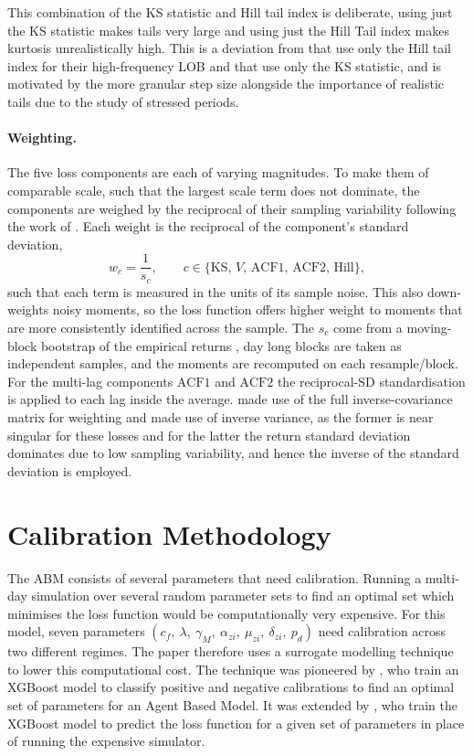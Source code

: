 This combination of the KS statistic and Hill tail index is deliberate, using just the KS statistic makes tails very large and using just the Hill Tail index makes kurtosis unrealistically high. This is a deviation from \cite{gao_2022_hfabm} that use only the Hill tail index for their high-frequency LOB and \cite{gao_2022_xgb} that use only the KS statistic, and is motivated by the more granular step size alongside the importance of realistic tails due to the study of stressed periods.

\paragraph{Weighting.} The five loss components are each of varying magnitudes. To make them of comparable scale, such that the largest scale term does not dominate, the components are weighed by the reciprocal of their sampling variability following the work of \cite{franke_westerhoff_2012}. Each weight is the reciprocal of the component's standard deviation,
\begin{equation}
\label{eq:cal-w}
w_c = \frac{1}{s_c}, \qquad c \in \{\mathrm{KS},\,V,\,\mathrm{ACF1},\,\mathrm{ACF2},\,\mathrm{Hill}\},
\end{equation}
such that each term is measured in the units of its sample noise. This also down-weights noisy moments, so the loss function offers higher weight to moments that are more consistently identified across the sample. 
The $s_c$ come from a moving-block bootstrap of the empirical returns \citep{kunsch_1989}, day long blocks are taken as independent samples, and the moments are recomputed on each resample/block. For the multi-lag components $\mathrm{ACF1}$ and $\mathrm{ACF2}$ the reciprocal-SD
standardisation is applied to each lag inside the average. \cite{franke_westerhoff_2012} made use of the full inverse-covariance matrix for weighting and \cite{gao_2022_hfabm} made use of inverse variance, as the former is near singular for these losses and for the latter the return standard deviation dominates due to low sampling variability, and hence the inverse of the standard deviation is employed. 


\section{Calibration Methodology}
\label{sec:cal-method}

The ABM consists of several parameters that need calibration. Running a multi-day simulation over several random parameter sets to find an optimal set which minimises the loss function would be computationally very expensive. For this model, seven parameters $(c_f,\ \lambda,\ \gamma_M,\ \alpha_{zi},\ \mu_{zi},\ \delta_{zi},\ p_d)$ need calibration across two different regimes. The paper therefore uses a surrogate modelling technique to lower this computational cost. The technique was  pioneered by \cite{lamperti_2018}, who train an XGBoost model to classify positive and negative calibrations to find an optimal set of parameters for an Agent Based Model. It was extended by \cite{gao_2022_xgb}, who train the XGBoost model to predict the loss function for a given set of parameters in place of running the expensive simulator.

